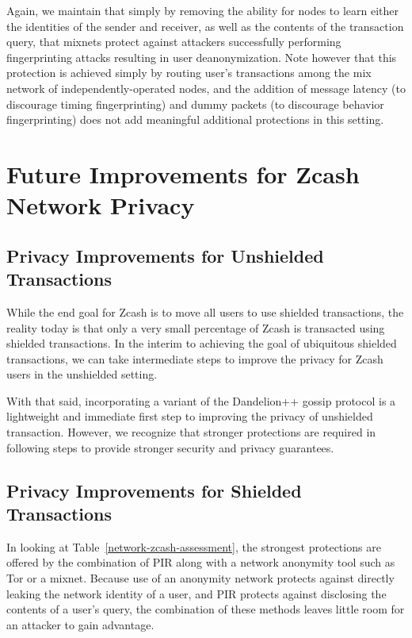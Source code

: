 \documentclass{article}
\begin{document}
Again, we maintain that simply
by removing the ability for nodes to learn either the identities of the sender
and receiver, as well as the contents of the transaction query, that mixnets
protect against attackers successfully performing fingerprinting attacks
resulting in user deanonymization. Note however that this protection is
achieved simply by routing user's transactions among the mix network of
independently-operated nodes, and the addition of message latency (to
discourage timing fingerprinting) and dummy packets (to discourage behavior
fingerprinting) does not add meaningful additional protections in this setting.

\section{Future Improvements for Zcash Network Privacy}

\subsection{Privacy Improvements for Unshielded Transactions}

While the end goal for Zcash is to move all users to use shielded transactions,
the reality today is that only a very small percentage of Zcash is transacted
using shielded transactions. In the interim to achieving the goal of
ubiquitous shielded transactions, we can take intermediate steps to improve
the privacy for Zcash users in the unshielded setting.

With that said, incorporating a variant of the Dandelion++ gossip protocol is a
lightweight and immediate first step to improving the privacy of unshielded
transaction. However, we recognize that stronger protections are required in
following steps to provide stronger security and privacy guarantees.

\subsection{Privacy Improvements for Shielded Transactions}

In looking at Table~\ref{network-zcash-assessment}, the strongest protections
are offered by the combination of PIR along with a network anonymity tool such
as Tor or a mixnet. Because use of an anonymity network protects against
directly leaking the network identity of a user, and PIR protects against
disclosing the contents of a user's query, the combination of these methods
leaves little room for an attacker to gain advantage.
\end{document}
